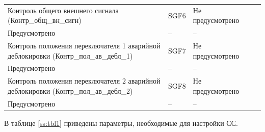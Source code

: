 \begin{longtable}{|>{\centering\arraybackslash}m{5.3cm}|>{\centering\arraybackslash}m{3.3cm}|>{\centering\arraybackslash}m{4.2cm}|>{\centering\arraybackslash}m{1.8cm}|>{\centering\arraybackslash}m{1cm}|}
\hline
\centering Контроль общего внешнего сигнала (Контр\_общ\_вн\_сигн)  & \centering SGF6 & \centering Не предусмотрено \\ Предусмотрено & \centering -- & \centering \arraybackslash -- \\
\hline
\centering Контроль положения переключателя 1 аварийной деблокировки (Контр\_пол\_ав\_дебл\_1)  & \centering SGF7 & \centering Не предусмотрено \\ Предусмотрено & \centering -- & \centering \arraybackslash -- \\
\hline
\centering Контроль положения переключателя 2 аварийной деблокировки (Контр\_пол\_ав\_дебл\_2)  & \centering SGF8 & \centering Не предусмотрено \\ Предусмотрено & \centering -- & \centering \arraybackslash -- \\
\hline
\end{longtable}
\normalsize



\par
В таблице \ref{ss:tbl1} приведены параметры, необходимые для настройки СС. 

